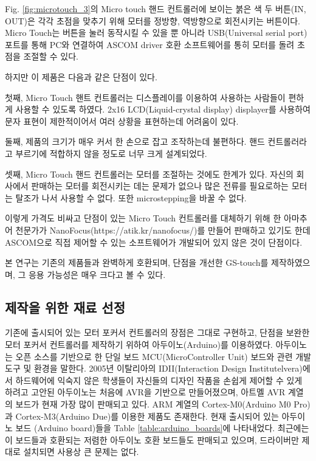 Fig. \ref{fig:microtouch_3}의 Micro touch 핸드 컨트롤러에 보이는 붉은 색 두 버튼(IN, OUT)은 각각 초점을 맞추기 위해 모터를 정방향, 역방향으로 회전시키는 버튼이다. Micro Touch는 버튼을 눌러 동작시킬 수 있을 뿐 아니라 USB(Universal serial port) 포트를 통해 PC와 연결하여 ASCOM driver 호환 소프트웨어를 통히 모터를 돌려 초점을 조절할 수 있다. 

하지만 이 제품은 다음과 같은 단점이 있다. 

첫째, Micro Touch 핸트 컨트롤러는 디스플레이를 이용하여 사용하는 사람들이 편하게 사용할 수 있도록 하였다. 2x16 LCD(Liquid-crystal display) displayer를 사용하여 문자 표현이 제한적이어서 여러 상황을 표현하는데 어려움이 있다. 

둘째, 제품의 크기가 매우 커서 한 손으로 잡고 조작하는데 불편하다. 핸드 컨트롤러라고 부르기에 적합하지 않을 정도로 너무 크게 설계되었다. 

셋째, Micro Touch 핸드 컨트롤러는 모터를 조절하는 것에도 한계가 있다. 자신의 회사에서 판매하는 모터를 회전시키는 데는 문제가 없으나 많은 전류를 필요로하는 모터는 탈조가 나서 사용할 수 없다. 또한 microstepping을 바꿀 수 없다. 

이렇게 가격도 비싸고 단점이 있는 Micro Touch 컨트롤러를 대체하기 위해 한 아마추어 천문가가 NanoFocus(https://atik.kr/nanofocus/)를 만들어 판매하고 있기도 한데 ASCOM으로 직접 제어할 수 있는 소프트웨어가 개발되어 있지 않은 것이 단점이다. 

본 연구는 기존의 제품들과 완벽하게 호환되며, 단점을 개선한 GS-touch를 제작하였으며, 그 응용 가능성은 매우 크다고 볼 수 있다. 


\subsection{제작을 위한 재료 선정}

기존에 출시되어 있는 모터 포커서 컨트롤러의 장점은 그대로 구현하고, 단점을 보완한 모터 포커서 컨트롤러를 제작하기 위하여 아두이노(Arduino)를 이용하였다. 아두이노는 오픈 소스를 기반으로 한 단일 보드 MCU(MicroController Unit) 보드와 관련 개발 도구 및 환경을 말한다. 2005년 이탈리아의 IDII(Interaction Design Institutelvera)에서 하드웨어에 익숙지 않은 학생들이 자신들의 디자인 작품을 손쉽게 제어할 수 있게 하려고 고안된 아두이노는 처음에 AVR을 기반으로 만들어졌으며, 아트멜 AVR 계열의 보드가 현재 가장 많이 판매되고 있다. ARM 계열의 Cortex-M0(Arduino M0 Pro)과 Cortex-M3(Arduino Due)를 이용한 제품도 존재한다. 현재 출시되어 있는 아두이노 보드 (Arduino board)들을 Table \ref{table:arduino_boards}에 나타내었다. 최근에는 이 보드들과 호환되는 저렴한 아두이노 호환 보드들도 판매되고 있으며, 드라이버만 제대로 설치되면 사용상 큰 문제는 없다. 

